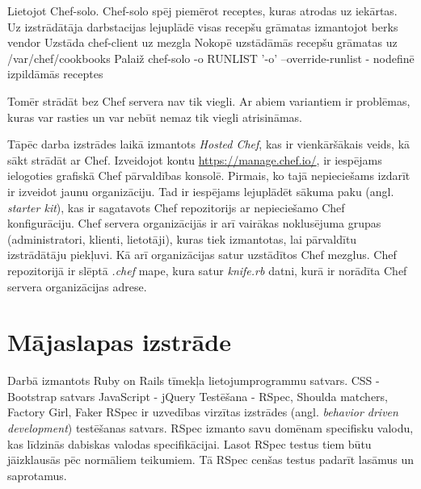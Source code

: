 Lietojot Chef-solo.
Chef-solo spēj piemērot receptes, kuras atrodas uz iekārtas.
Uz izstrādātāja darbstacijas lejuplādē visas recepšu grāmatas izmantojot berks vendor
Uzstāda chef-client uz mezgla
Nokopē uzstādāmās recepšu grāmatas uz /var/chef/cookbooks
Palaiž chef-solo -o RUNLIST
'-o' --override-runlist	- nodefinē izpildāmās receptes

Tomēr strādāt bez Chef servera nav tik viegli. Ar abiem variantiem ir problēmas, kuras var rasties un var nebūt nemaz tik viegli atrisināmas.

Tāpēc darba izstrādes laikā izmantots \textit{Hosted Chef}, kas ir vienkāršākais veids, kā sākt strādāt ar Chef.
Izveidojot kontu \url{https://manage.chef.io/}, ir iespējams ielogoties grafiskā Chef pārvaldības konsolē.
Pirmais, ko tajā nepieciešams izdarīt ir izveidot jaunu organizāciju. Tad ir iespējams lejuplādēt sākuma paku (angl. \textit{starter kit}), kas ir sagatavots Chef repozitorijs ar nepieciešamo Chef konfigurāciju. Chef servera organizācijās ir arī vairākas noklusējuma grupas (administratori, klienti, lietotāji), kuras tiek izmantotas, lai pārvaldītu izstrādātāju piekļuvi. Kā arī organizācijas satur uzstādītos Chef mezglus. Chef repozitorijā ir slēptā \textit{.chef} mape, kura satur \textit{knife.rb} datni, kurā ir norādīta Chef servera organizācijas adrese.

\section{Mājaslapas izstrāde}
Darbā izmantots Ruby on Rails  tīmekļa lietojumprogrammu satvars.
CSS - Bootstrap satvars
JavaScript - jQuery
Testēšana - RSpec, Shoulda matchers, Factory Girl, Faker
RSpec ir uzvedības virzītas izstrādes (angl. \textit{behavior driven development}) testēšanas satvars. RSpec izmanto savu domēnam specifisku valodu, kas līdzinās dabiskas valodas specifikācijai. Lasot RSpec testus tiem būtu jāizklausās pēc normāliem teikumiem. Tā RSpec cenšas testus padarīt lasāmus un saprotamus.

